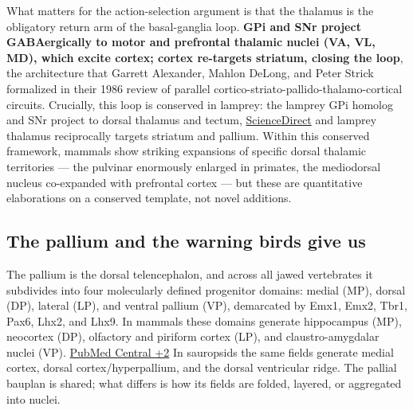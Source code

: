 What matters for the action-selection argument is that the thalamus is the obligatory return arm of the basal-ganglia loop. \textbf{GPi and SNr project GABAergically to motor and prefrontal thalamic nuclei (VA, VL, MD), which excite cortex; cortex re-targets striatum, closing the loop}, the architecture that Garrett Alexander, Mahlon DeLong, and Peter Strick formalized in their 1986 review of parallel cortico-striato-pallido-thalamo-cortical circuits. Crucially, this loop is conserved in lamprey: the lamprey GPi homolog and SNr project to dorsal thalamus and tectum, \href{https://www.sciencedirect.com/science/article/pii/S0960982214012998}{ScienceDirect} and lamprey thalamus reciprocally targets striatum and pallium. Within this conserved framework, mammals show striking expansions of specific dorsal thalamic territories --- the pulvinar enormously enlarged in primates, the mediodorsal nucleus co-expanded with prefrontal cortex --- but these are quantitative elaborations on a conserved template, not novel additions.

\subsection{The pallium and the warning birds give us}\label{05_vertebrates-the-pallium-and-the-warning-birds-give-us}

The pallium is the dorsal telencephalon, and across all jawed vertebrates it subdivides into four molecularly defined progenitor domains: medial (MP), dorsal (DP), lateral (LP), and ventral pallium (VP), demarcated by Emx1, Emx2, Tbr1, Pax6, Lhx2, and Lhx9. In mammals these domains generate hippocampus (MP), neocortex (DP), olfactory and piriform cortex (LP), and claustro-amygdalar nuclei (VP). \href{https://pmc.ncbi.nlm.nih.gov/articles/PMC4429232/}{PubMed Central +2} In sauropsids the same fields generate medial cortex, dorsal cortex/hyperpallium, and the dorsal ventricular ridge. The pallial bauplan is shared; what differs is how its fields are folded, layered, or aggregated into nuclei.

